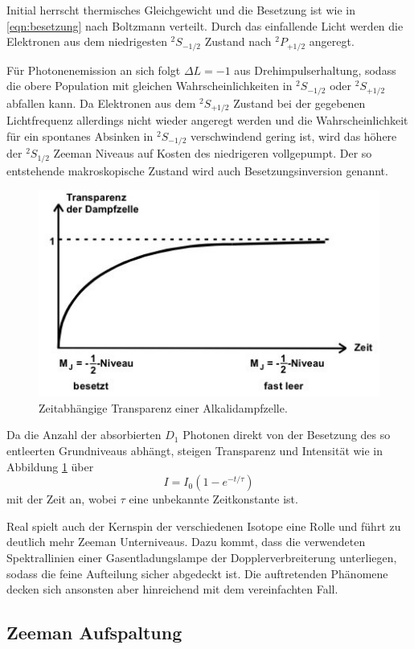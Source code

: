 Initial herrscht thermisches Gleichgewicht und die Besetzung ist wie in \eqref{eqn:besetzung} nach Boltzmann verteilt. Durch das
einfallende Licht werden die Elektronen aus dem niedrigesten $^2S_{-1/2}$ Zustand nach $^2P_{+1/2}$ angeregt.

Für Photonenemission an sich folgt $\Delta L = -1$ aus Drehimpulserhaltung, sodass die obere Population mit gleichen
Wahrscheinlichkeiten in $^2S_{-1/2}$ oder $^2S_{+1/2}$ abfallen kann. Da Elektronen aus dem $^2S_{+1/2}$
Zustand bei der gegebenen Lichtfrequenz allerdings nicht wieder angeregt werden und die Wahrscheinlichkeit für ein spontanes
Absinken in $^2S_{-1/2}$ verschwindend gering ist, wird das höhere der $^2S_{1/2}$ Zeeman Niveaus auf Kosten des niedrigeren
vollgepumpt. Der so entstehende makroskopische Zustand wird auch Besetzungsinversion genannt.

\begin{figure}[H]
	\centering
	\includegraphics[width=0.6\linewidth]{content/grafik/transparenz.jpg}
	\caption{Zeitabhängige Transparenz einer Alkalidampfzelle. \cite{pumpen}}
	\label{fig:transparenz}
\end{figure}

Da die Anzahl der absorbierten
$D_1$ Photonen direkt von der Besetzung des so entleerten Grundniveaus abhängt, steigen Transparenz und Intensität wie
in Abbildung \ref{fig:transparenz} über
\begin{equation*}
	I = I_0 \left( 1 - e^{-t/\tau} \right)
\end{equation*}
mit der Zeit an, wobei $\tau$ eine unbekannte Zeitkonstante ist.

Real spielt auch der Kernspin der verschiedenen Isotope eine Rolle und führt zu deutlich mehr Zeeman Unterniveaus. Dazu kommt,
dass die verwendeten Spektrallinien einer Gasentladungslampe der Dopplerverbreiterung unterliegen, sodass die feine Aufteilung
sicher abgedeckt ist. Die auftretenden Phänomene decken sich ansonsten aber hinreichend mit dem vereinfachten Fall.

\subsection{Zeeman Aufspaltung}


